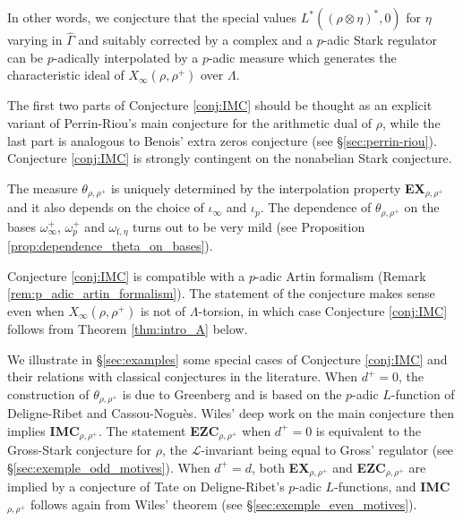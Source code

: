 \documentclass[12pt]{amsart}
\newcommand\cL{\mathcal{L}}
\newcommand{\ff}{\mathrm{f}}
\theoremstyle{defstyle}
\theoremstyle{thmstyle}
\begin{document}
In other words, we conjecture that the special values $L^*((\rho\otimes\eta)^*,0)$ for $\eta$ varying in $\widehat{\Gamma}$ and suitably corrected by a complex and a $p$-adic Stark regulator can be $p$-adically interpolated by a $p$-adic measure which generates the characteristic ideal of $X_\infty(\rho,\rho^+)$ over $\Lambda$.

The first two parts of Conjecture \ref{conj:IMC} should be thought as an explicit variant of Perrin-Riou's main conjecture \cite{perrin1995fonctions,colmezfonctions} for the arithmetic dual of $\rho$, while the last part is analogous  to Benois' extra zeros conjecture \cite{benoiscrys} (see \S\ref{sec:perrin-riou}). Conjecture \ref{conj:IMC} is strongly contingent on the nonabelian Stark conjecture.  

The measure $\theta_{\rho,\rho^+}$ is uniquely determined by the interpolation property \textbf{EX}$_{\rho,\rho^+}$ and it also depends on the choice of $\iota_\infty$ and $\iota_p$. The dependence of $\theta_{\rho,\rho^+}$ on the bases $\omega_\infty^+$, $\omega_p^+$ and $\omega_{\ff,\eta}$ turns out to be very mild (see Proposition \ref{prop:dependence_theta_on_bases}).


Conjecture \ref{conj:IMC} is compatible with a $p$-adic Artin formalism (Remark \ref{rem:p_adic_artin_formalism}).
The statement of the conjecture makes sense even when $X_\infty(\rho,\rho^+)$ is not of $\Lambda$-torsion, in which case Conjecture \ref{conj:IMC} follows from Theorem \ref{thm:intro_A} below.

We illustrate in \S\ref{sec:examples} some special cases of Conjecture \ref{conj:IMC} and their relations with classical conjectures in the literature. When $d^+=0$, the construction of $\theta_{\rho,\rho^+}$ is due to Greenberg and is based on the $p$-adic $L$-function of Deligne-Ribet and Cassou-Noguès. Wiles' deep work on the main conjecture then implies \textbf{IMC}$_{\rho,\rho^+}$. The statement \textbf{EZC}$_{\rho,\rho^+}$ when $d^+=0$ is equivalent to the Gross-Stark conjecture for $\rho$, the $\cL$-invariant being equal to Gross' regulator (see \S\ref{sec:exemple_odd_motives}). When $d^+=d$, both \textbf{EX}$_{\rho,\rho^+}$ and \textbf{EZC}$_{\rho,\rho^+}$ are implied by a conjecture of Tate on Deligne-Ribet's $p$-adic $L$-functions, and \textbf{IMC}$_{\rho,\rho^+}$ follows again from Wiles' theorem (see \S\ref{sec:exemple_even_motives}). 
\end{document}
